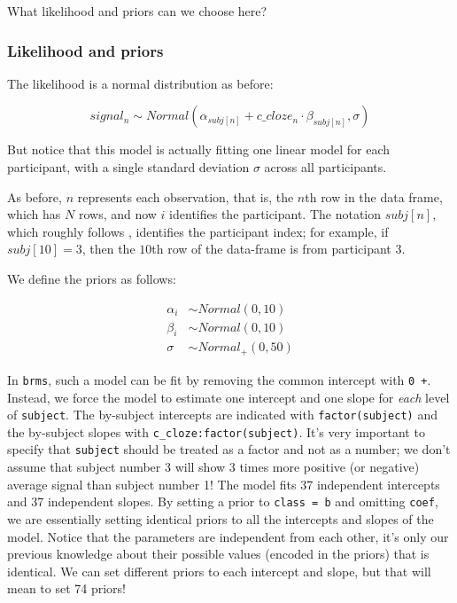\documentclass[12pt,]{krantz}
\theoremstyle{definition}
\theoremstyle{definition}
\theoremstyle{definition}
\theoremstyle{remark}
\begin{document}
What likelihood and priors can we choose here?

\subsubsection{Likelihood and priors}\label{likelihood-and-priors-2}

The likelihood is a normal distribution as before:

\begin{equation}
 signal_n \sim Normal( \alpha_{subj[n]} + c\_cloze_n \cdot \beta_{subj[n]},\sigma)
 \end{equation}

But notice that this model is actually fitting one linear model for each
participant, with a single standard deviation \(\sigma\) across all
participants.

As before, \(n\) represents each observation, that is, the \(n\)th row
in the data frame, which has \(N\) rows, and now \(i\) identifies the
participant. The notation \(subj[n]\), which roughly follows
\citet{GelmanHill2007}, identifies the participant index; for example,
if \(subj[10]=3\), then the \(10\)th row of the data-frame is from
participant \(3\).

We define the priors as follows:

\begin{equation}
 \begin{aligned}
 \alpha_i &\sim Normal(0,10)\\
 \beta_i  &\sim Normal(0,10)\\
 \sigma  &\sim Normal_+(0,50)
 \end{aligned}
 \end{equation}

In \texttt{brms}, such a model can be fit by removing the common
intercept with \texttt{0\ +}. Instead, we force the model to estimate
one intercept and one slope for \emph{each} level of \texttt{subject}.
The by-subject intercepts are indicated with \texttt{factor(subject)}
and the by-subject slopes with \texttt{c\_cloze:factor(subject)}. It's
very important to specify that \texttt{subject} should be treated as a
factor and not as a number; we don't assume that subject number 3 will
show 3 times more positive (or negative) average signal than subject
number 1! The model fits 37 independent intercepts and 37 independent
slopes. By setting a prior to \texttt{class\ =\ b} and omitting
\texttt{coef}, we are essentially setting identical priors to all the
intercepts and slopes of the model. Notice that the parameters are
independent from each other, it's only our previous knowledge about
their possible values (encoded in the priors) that is identical. We can
set different priors to each intercept and slope, but that will mean to
set 74 priors!
\end{document}
